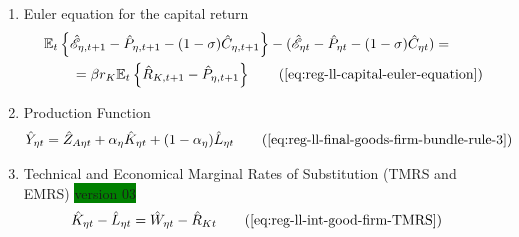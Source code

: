 \documentclass[../thesis.tex]{subfiles}
\begin{document}
{\begin{itemize}
\begin{enumerate}
		\item Euler equation for the capital return
		\begin{alignat}{2}
			& \E \left\{ \hat{\mathscr{E}}_{\eta, t+1} - \hat{P}_{\eta, t+1}  - (1 -\sigma) \hat{C}_{\eta, t+1} \right\} - (\hat{\mathscr{E}}_{\eta t} - \hat{P}_{\eta t} - (1 -\sigma) \hat{C}_{\eta t}) = \nonumber \\
			& \qquad = \beta r_{K} \mathbb{E}_t \left\{ \hat{R}_{K, t+1} - \hat{P}_{\eta, t+1} \right\} \tag{\ref{eq:reg-ll-capital-euler-equation}}
		\end{alignat}
		
		\item Production Function
		\begin{align}
			\hat{Y}_{\eta t} &= \hat{Z}_{A\eta t} + {\alpha_{\eta}} \hat{K}_{\eta t} + (1-{\alpha_{\eta}}) \hat{L}_{\eta t} \tag{\ref{eq:reg-ll-final-goods-firm-bundle-rule-3}}
		\end{align}

		\item Technical and Economical Marginal Rates of Substitution (TMRS and EMRS) \colorbox{green}{version 03}
		\begin{align}
			\hat{K}_{\eta t} - \hat{L}_{\eta t} &= \hat{W}_{\eta t} - \hat{R}_{K t} \tag{\ref{eq:reg-ll-int-good-firm-TMRS}}
		\end{align}

\begin{comment}
	
	\item Technical and Economical Marginal Rates of Substitution (TMRS and EMRS) \colorbox{green}{version 03}
	\begin{align}
		\hat{K}_{\eta t} - \hat{L}_{\eta t} &= \hat{W}_{\eta t} - \hat{R}_{K t} \tag{\ref{eq:reg-ll-int-good-firm-TMRS}}
	\end{align}
	
\end{comment}
		
\begin{comment}
	\item Capital and Labor Levels 
	\begin{align}
		\hat{K}_{1t} - \hat{L}_{1t} &= \hat{K}_{2t} - \hat{L}_{2t} \tag{\ref{eq:reg-ll-int-good-firm-TMRS-b}}
	\end{align}		
		
\end{comment}
		
		

\end{enumerate}
\end{itemize}}
\end{document}
